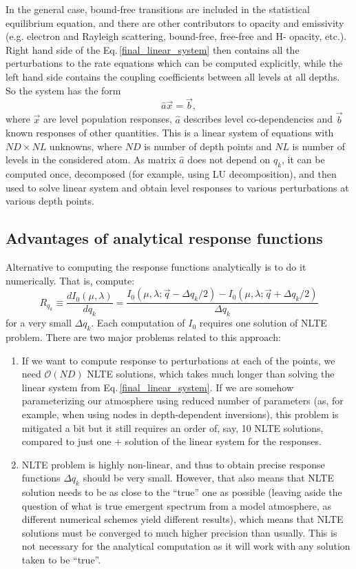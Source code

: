 \documentclass[referee]{aa}
\begin{document}
In the general case, bound-free transitions are included in the statistical equilibrium equation, and there are other contributors to opacity and emissivity (e.g. electron and Rayleigh scattering, bound-free, free-free and H- opacity, etc.). Right hand side of the Eq.\,\ref{final_linear_system} then contains all the perturbations to the rate equations which can be computed explicitly, while the left hand side contains the coupling coefficients between all levels at all depths. So the system has the form
\begin{equation}
 \hat{a} \vec{x} = \vec{b},
\end{equation}
where $\vec{x}$ are level population responses, $\hat{a}$ describes level co-dependencies and $\vec{b}$ known responses of other quantities. This is a linear system of equations with $ND \times NL$ unknowns, where $ND$ is number of depth points and $NL$ is number of levels in the considered atom. As matrix $\hat{a}$ does not depend on $q_k$, it can be computed once, decomposed (for example, using LU decomposition), and then used to solve linear system and obtain level responses to various perturbations at various depth points. 

\subsection{Advantages of analytical response functions}

Alternative to computing the response functions analytically is to do it numerically. That is, compute:
\begin{equation}
 R_{q_k} \equiv \frac{d I_0(\mu,\lambda)}{d q_k} = \frac{I_0(\mu,\lambda; \vec{q} - \Delta q_k/2) - I_0(\mu,\lambda; \vec{q}+\Delta q_k/2)}{\Delta q_k}
 \label{fin_diff}
\end{equation}
for a very small $\Delta q_k$. Each computation of $I_0$ requires one solution of NLTE problem. There are two major problems related to this approach:
\begin{enumerate}
 \item If we want to compute response to perturbations at each of the points, we need $\mathcal{O}(ND)$ NLTE solutions, which takes much longer than solving the linear system from Eq.\,\ref{final_linear_system}. If we are somehow parameterizing our atmosphere using reduced number of parameters (as, for example, when using nodes in depth-dependent inversions), this problem is mitigated a bit but it still requires an order of, say, 10 NLTE solutions, compared to just one + solution of the linear system for the responses.
 \item NLTE problem is highly non-linear, and thus to obtain precise response functions $\Delta q_k$ should be very small. However, that also means that NLTE solution needs to be as close to the ``true'' one as possible (leaving aside the question of what is true emergent spectrum from a model atmosphere, as different numerical schemes yield different results), which means that NLTE solutions must be converged to much higher precision than usually. This is not necessary for the analytical computation as it will work with any solution taken to be ``true''.
\end{enumerate}
\end{document}
